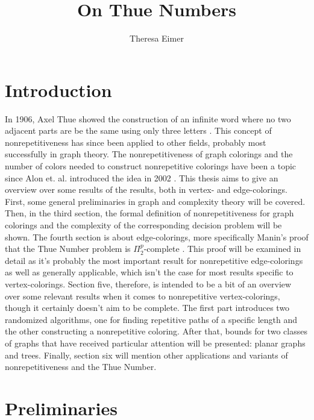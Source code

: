 \documentclass[12pt,a4paper]{article}
\author{Theresa Eimer}
\title{On Thue Numbers}
\date{}
\begin{document}
\renewcommand{\figurename}{Fig.}
\maketitle
\thispagestyle{empty}
\newpage
\tableofcontents
\thispagestyle{empty}
\newpage

\section{Introduction}
In 1906, Axel Thue showed the construction of an infinite word where no two adjacent parts are be the same using only three letters \citep{Thue1906}. This concept of nonrepetitiveness has since been applied to other fields, probably most successfully in graph theory. The nonrepetitiveness of graph colorings and the number of colors needed to construct nonrepetitive colorings have been a topic since Alon et. al. introduced the idea in 2002 \citep{Alon2002}. This thesis aims to give an overview over some results of the results, both in vertex- and edge-colorings. 
\newline
First, some general preliminaries in graph and complexity theory will be covered. 
\newline
Then, in the third section, the formal definition of nonrepetitiveness for graph colorings and the complexity of the corresponding decision problem will be shown. 
\newline
The fourth section is about edge-colorings, more specifically Manin's proof that the Thue Number problem is $\Pi^p_2$-complete \citep{Manin2008}. This proof will be examined in detail as it's probably the most important result for nonrepetitive edge-colorings as well as generally applicable, which isn't the case for most results specific to vertex-colorings.
\newline
Section five, therefore, is intended to be a bit of an overview over some relevant results when it comes to nonrepetitive vertex-colorings, though it certainly doesn't aim to be complete. The first part introduces two randomized algorithms, one for finding repetitive paths of a specific length and the other constructing a nonrepetitive coloring. After that, bounds for two classes of graphs that have received particular attention will be presented: planar graphs and trees. 
\newline
Finally, section six will mention other applications and variants of nonrepetitiveness and the Thue Number.
\newpage
\section{Preliminaries}
\end{document}
